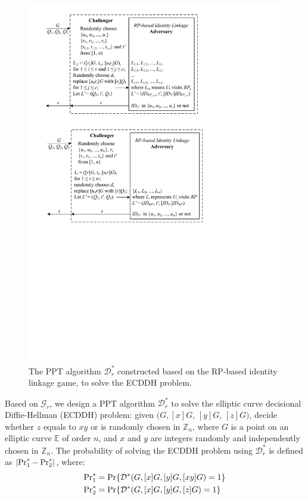 {\begin{figure}[tb]
  \centering
  \includegraphics[width=0.99\linewidth]{fig/dalgorithm-lemma2.pdf}
  \caption{The PPT algorithm $\mathcal{D}^*_r$ constructed based on the RP-based identity linkage game, to solve the ECDDH problem.}
  \label{fig:dalgorithm}
\end{figure}


Based on $\mathcal{G}_r$, we design a PPT algorithm $\mathcal{D}^*_r$ to solve the elliptic curve decisional Diffie-Hellman (ECDDH) problem:
 given $(G, [x]G$, $[y]G$, $[z]G)$, decide whether $z$ equals to $xy$ or is randomly chosen in $\mathbb{Z}_n$,
    where $G$ is a point on an elliptic curve $\mathbb{E}$ of order $n$, and $x$ and $y$ are integers randomly and independently chosen in $\mathbb{Z}_n$.
The probability of solving the ECDDH problem using $\mathcal{D}^*_r$ is defined as $|{\rm Pr}^*_1 - {\rm Pr}^*_2|$, where:
\vspace{-3mm}
\begin{align*}
&{\rm Pr}^*_1 =  {\rm Pr}\{\mathcal{D}^*(G, [x]G, [y]G, [xy]G)=1\} \\
&{\rm Pr}^*_2 =  {\rm Pr}\{\mathcal{D}^*(G, [x]G, [y]G, [z]G)=1\}
\end{align*}
\vspace{-4mm}

}
